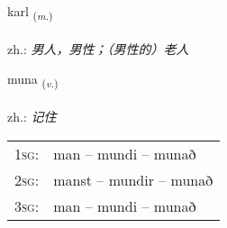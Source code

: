\documentclass[frontgrid, backgrid]{flacards}\usepackage[]{graphicx}\usepackage[]{xcolor}
\begin{document}
\renewcommand{\flhead}{\vskip5pt \fboxsep=0pt {\small\bfseries\footnotesize Nafnorð | 名词}}
\renewcommand{\fcfoot}{\vskip5pt \fboxsep=0pt \hspace{2pt}{\small\bfseries\footnotesize 1K}}

\renewcommand{\blhead}{\vskip5pt {\small\bfseries\footnotesize Nafnorð | 名词 }}
\renewcommand{\bcfoot}{\vskip5pt \hspace{2pt}{\small\bfseries\footnotesize 1K}}


{karl \small{\textsubscript{(\textit{m.})}} \\[1ex] %
\textphonetic{[kʰartl̥]} \\
zh.: \emph{男人，男性；（男性的）老人} \\  [2ex]
\renewcommand*{\arraystretch}{0.8}
}

\renewcommand{\flhead}{\vskip5pt \fboxsep=0pt {\small\bfseries\footnotesize Sagnorð | 动词}}
\renewcommand{\fcfoot}{\vskip5pt \fboxsep=0pt \hspace{2pt}{\small\bfseries\footnotesize 1K}}

\renewcommand{\blhead}{\vskip5pt {\small\bfseries\footnotesize Sagnorð | 动词 }}
\renewcommand{\bcfoot}{\vskip5pt \hspace{2pt}{\small\bfseries\footnotesize 1K}}


{muna \small{\textsubscript{(\textit{v.})}} \\[1ex] %
\textphonetic{[mʏːna]} \\
zh.: \emph{记住} \\  [2ex]
\renewcommand*{\arraystretch}{0.8}
\begin{tabular}{p{1cm}l}
\textsc{1sg}: & man -- mundi -- munað \\ 
\textsc{2sg}: & manst -- mundir -- munað \\ 
\textsc{3sg}: & man -- mundi -- munað \\ 
\end{tabular}
}
\end{document}
